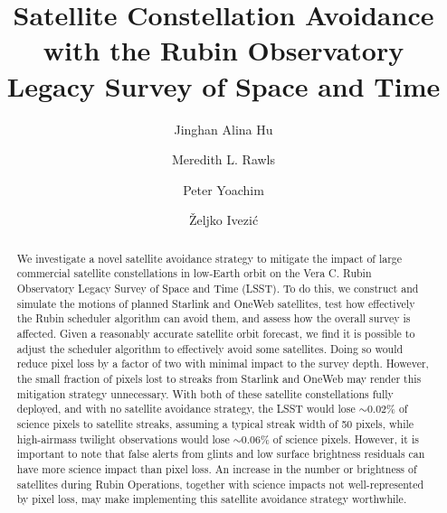 \documentclass[twocolumn]{aastex631}
\begin{document}
\title{Satellite Constellation Avoidance with the Rubin Observatory Legacy Survey of Space and Time}

\author[0000-0002-8400-1910]{Jinghan Alina Hu}
\author[0000-0003-1305-7308]{Meredith L. Rawls}
\author[0000-0003-2874-6464]{Peter Yoachim}
\author[0000-0001-5250-2633]{\v{Z}eljko Ivezi\'{c}}


\begin{abstract}
We investigate a novel satellite avoidance strategy to mitigate the impact of large commercial satellite constellations in low-Earth orbit on the Vera C. Rubin Observatory Legacy Survey of Space and Time (LSST). To do this, we construct and simulate the motions of planned Starlink and OneWeb satellites, test how effectively the Rubin scheduler algorithm can avoid them, and assess how the overall survey is affected.
Given a reasonably accurate satellite orbit forecast, we find it is possible to adjust the scheduler algorithm to effectively avoid some satellites. Doing so would reduce pixel loss by a factor of two with minimal impact to the survey depth. However, the small fraction of pixels lost to streaks from Starlink and OneWeb may render this mitigation strategy unnecessary.
With both of these satellite constellations fully deployed, and with no satellite avoidance strategy, the LSST would lose $\sim$0.02\% of science pixels to satellite streaks, assuming a typical streak width of 50 pixels, while high-airmass twilight observations would lose $\sim$0.06\% of science pixels.
However, it is important to note that false alerts from glints and low surface brightness residuals can have more science impact than pixel loss.
An increase in the number or brightness of satellites during Rubin Operations, together with science impacts not well-represented by pixel loss, may make implementing this satellite avoidance strategy worthwhile.
\end{abstract}


\end{document}
